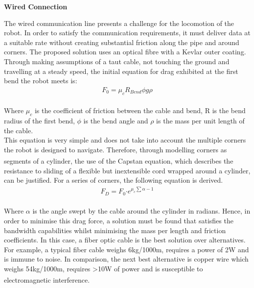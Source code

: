 \documentclass[11pt]{article}		%
\newcommand{\supercite}[1]{\textsuperscript{\cite{#1}}}		%
\begin{document}
            \textbf{Wired Connection}
   			\begin{floatingfigure}[r]{0pt} \end{floatingfigure}
	        The wired communication line presents a challenge for the locomotion of the robot. 
	        In order to satisfy the communication requirements, it must deliver data at a suitable rate without creating substantial friction along the pipe and around corners. 
	        The proposed solution uses an optical fibre with a Kevlar outer coating. 
	        Through making assumptions of a taut cable, not touching the ground and travelling at a steady speed, the initial equation for drag exhibited at the first bend the robot meets is:
	        \begin{align}
					F_0 = \mu_c R_{Bend} \phi g \rho
			\end{align}
	        \\
            \hspace*{2ex}Where $\mu_c$ is the coefficient of friction between the cable and bend, R is the bend radius of the first bend, $\phi$ is the bend angle and $\rho$ is the mass per unit length of the cable.
	        \\
            \hspace*{2ex}This equation is very simple and does not take into account the multiple corners the robot is designed to navigate.
	        Therefore, through modelling corners as segments of a cylinder, the use of the Capstan equation\supercite{capstan}, which describes the resistance to sliding of a flexible but inextensible cord wrapped around a cylinder, can be justified. 
	        For a series of corners, the following equation is derived.
	        \begin{align}
	                F_D = F_0 \boldsymbol{\cdot} {e}^{\mu_c \sum \alpha -1} \label{cableDrag}
	        \end{align}
	        \\
            \hspace*{2ex}Where $\alpha$ is the angle swept by the cable around the cylinder in radians. 
		    Hence, in order to minimise this drag force, a solution must be found that satisfies the bandwidth capabilities whilst minimising the mass per length and friction coefficients.  
		    In this case, a fiber optic cable is the best solution over alternatives. 
		    For example, a typical fiber cable weighs 6kg/1000m, requires a power of 2W and is immune to noise. 
		    In comparison, the next best alternative is copper wire which weighs 54kg/1000m, requires >10W of power and is susceptible to electromagnetic interference\supercite{wiring}.
\end{document}
